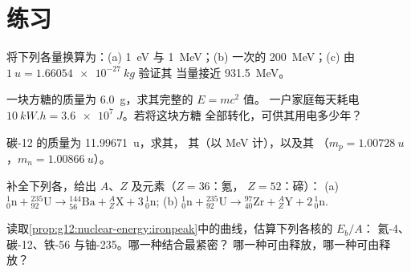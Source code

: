 \section{练习}

\begin{exercise}[$\star$]\label{exo:g12:nuclear-energy:1}
将下列各量换算为：(a) \qty{1}{eV} 与 \qty{1}{MeV}；(b) 一次的
\qty{200}{MeV}；(c) 由 $\qty{1}{u} = \qty{1.66054e-27}{kg}$ 验证其
当量接近 \qty{931.5}{MeV}。
\end{exercise}

\begin{exercise}[$\star$]\label{exo:g12:nuclear-energy:2}
一块方糖的质量为 \qty{6.0}{g}，求其完整的 $E = mc^2$ 值。
一户家庭每天耗电 $\qty{10}{kW.h} = \qty{3.6e7}{J}$。若将这块方糖
全部转化，可供其用电多少年？
\end{exercise}

\begin{exercise}[$\star$]\label{exo:g12:nuclear-energy:3}
碳-12 的质量为 \qty{11.99671}{u}，求其，
其（以 \unit{MeV} 计），以及其
（$m_p = \qty{1.00728}{u}$，$m_n = \qty{1.00866}{u}$）。
\end{exercise}

\begin{exercise}[$\star$]\label{exo:g12:nuclear-energy:4}
补全下列各，给出 $A$、$Z$ 及元素（$Z = 36$：氪，
$Z = 52$：碲）：
(a) ${}^{1}_{0}\mathrm{n} + {}^{235}_{92}\mathrm{U} \to
{}^{144}_{56}\mathrm{Ba} + {}^{A}_{Z}\mathrm{X} + 3\,{}^{1}_{0}\mathrm{n}$;
(b) ${}^{1}_{0}\mathrm{n} + {}^{235}_{92}\mathrm{U} \to
{}^{97}_{40}\mathrm{Zr} + {}^{A}_{Z}\mathrm{Y} + 2\,{}^{1}_{0}\mathrm{n}$.
\end{exercise}

\begin{exercise}[$\star$]\label{exo:g12:nuclear-energy:5}
读取\cref{prop:g12:nuclear-energy:ironpeak}中的曲线，估算下列各核的 $E_b/A$：
氦-4、碳-12、铁-56 与铀-235。哪一种结合最紧密？
哪一种可由释放，哪一种可由释放？
\end{exercise}

